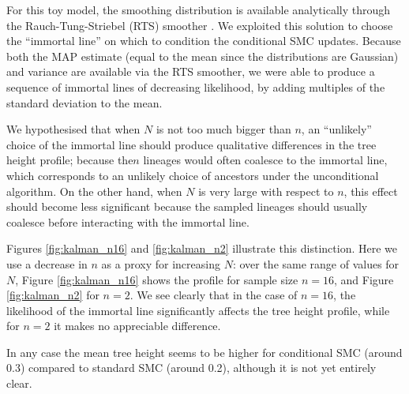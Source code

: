 \documentclass{article}
\begin{document}
For this toy model, the smoothing distribution is available analytically through the Rauch-Tung-Striebel (RTS) smoother \citep{rauch1965}. We exploited this solution to choose the ``immortal line'' on which to condition the conditional SMC updates. Because both the MAP estimate (equal to the mean since the distributions are Gaussian) and variance are available via the RTS smoother, we were able to produce a sequence of immortal lines of decreasing likelihood, by adding multiples of the standard deviation to the mean.

We hypothesised that when $N$ is not too much bigger than $n$, an ``unlikely'' choice of the immortal line should produce qualitative differences in the tree height profile; because the$n$ lineages would often coalesce to the immortal line, which corresponds to an unlikely choice of ancestors under the unconditional algorithm. On the other hand, when $N$ is very large with respect to $n$, this effect should become less significant because the sampled lineages should usually coalesce before interacting with the immortal line.

Figures \ref{fig:kalman_n16} and \ref{fig:kalman_n2} illustrate this distinction. Here we use a decrease in $n$ as a proxy for increasing $N$: over the same range of values for $N$, Figure \ref{fig:kalman_n16} shows the profile for sample size $n=16$, and Figure \ref{fig:kalman_n2} for $n=2$.
We see clearly that in the case of $n=16$, the likelihood of the immortal line significantly affects the tree height profile, while for $n=2$ it makes no appreciable difference.

In any case the mean tree height seems to be higher for conditional SMC (around 0.3) compared to standard SMC (around 0.2), although it is not yet entirely clear.
\end{document}
